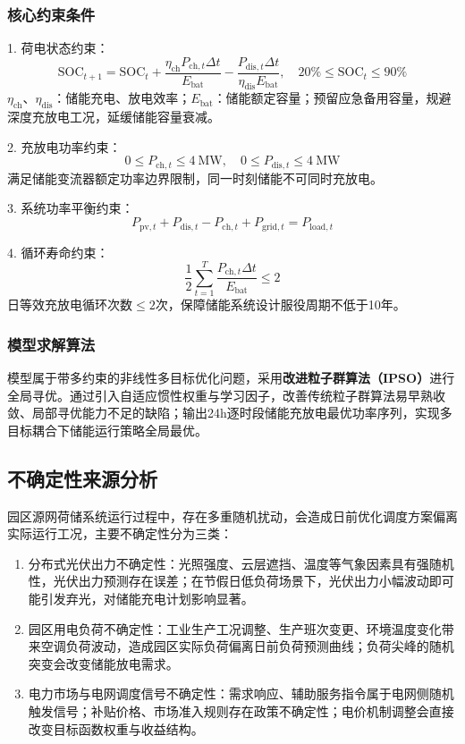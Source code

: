 \documentclass[12pt,a4paper]{article}
\begin{document}
\subsubsection{核心约束条件}
1. 荷电状态约束：
\[
\text{SOC}_{t+1}=\text{SOC}_{t}+\frac{\eta_{\text{ch}} P_{\text{ch},t}\Delta t}{E_{\text{bat}}}-\frac{P_{\text{dis},t}\Delta t}{\eta_{\text{dis}} E_{\text{bat}}},\quad 20\% \le \text{SOC}_{t} \le 90\%
\]
$\eta_{\text{ch}}、\eta_{\text{dis}}$：储能充电、放电效率；$E_{\text{bat}}$：储能额定容量；预留应急备用容量，规避深度充放电工况，延缓储能容量衰减。

2. 充放电功率约束：
\[
0 \le P_{\text{ch},t} \le 4\ \text{MW},\quad 0 \le P_{\text{dis},t} \le 4\ \text{MW}
\]
满足储能变流器额定功率边界限制，同一时刻储能不可同时充放电。

3. 系统功率平衡约束：
\[
P_{\text{pv},t} + P_{\text{dis},t} - P_{\text{ch},t} + P_{\text{grid},t} = P_{\text{load},t}
\]

4. 循环寿命约束：
\[
\frac{1}{2}\sum_{t=1}^{T}\frac{P_{\text{ch},t}\Delta t}{E_{\text{bat}}} \le 2
\]
日等效充放电循环次数$\le 2$次，保障储能系统设计服役周期不低于10年。

\subsubsection{模型求解算法}
模型属于带多约束的非线性多目标优化问题，采用\textbf{改进粒子群算法（IPSO）}进行全局寻优。通过引入自适应惯性权重与学习因子，改善传统粒子群算法易早熟收敛、局部寻优能力不足的缺陷；输出24h逐时段储能充放电最优功率序列，实现多目标耦合下储能运行策略全局最优。

\subsection{不确定性来源分析}
园区源网荷储系统运行过程中，存在多重随机扰动，会造成日前优化调度方案偏离实际运行工况，主要不确定性分为三类：
\begin{enumerate}
    \item 分布式光伏出力不确定性：光照强度、云层遮挡、温度等气象因素具有强随机性，光伏出力预测存在误差；在节假日低负荷场景下，光伏出力小幅波动即可能引发弃光，对储能充电计划影响显著。
    \item 园区用电负荷不确定性：工业生产工况调整、生产班次变更、环境温度变化带来空调负荷波动，造成园区实际负荷偏离日前负荷预测曲线；负荷尖峰的随机突变会改变储能放电需求。
    \item 电力市场与电网调度信号不确定性：需求响应、辅助服务指令属于电网侧随机触发信号；补贴价格、市场准入规则存在政策不确定性；电价机制调整会直接改变目标函数权重与收益结构。
\end{enumerate}
\end{document}

